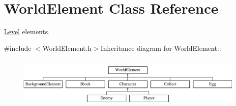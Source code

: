 \hypertarget{classWorldElement}{
\section{WorldElement Class Reference}
\label{classWorldElement}
}


\hyperlink{classLevel}{Level} elements.  


{\ttfamily \#include $<$WorldElement.h$>$}Inheritance diagram for WorldElement::\begin{figure}[H]
\begin{center}
\leavevmode
\includegraphics[height=2.54545cm]{classWorldElement}
\end{center}
\end{figure}
